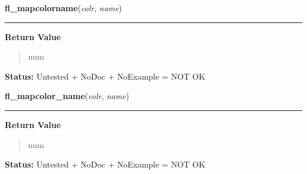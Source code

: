 \hspace{.8\funcindent}\begin{boxedminipage}{\funcwidth}

    \raggedright \textbf{fl\_mapcolorname}(\textit{colr}, \textit{name})

    \vspace{-1.5ex}

    \rule{\textwidth}{0.5\fboxrule}
\setlength{\parskip}{2ex}
\setlength{\parskip}{1ex}
      \textbf{Return Value}
    \vspace{-1ex}

      \begin{quote}
      num

      \end{quote}

\textbf{Status:} Untested + NoDoc + NoExample = NOT OK



    \end{boxedminipage}

    \label{xformslib:library:fl_mapcolorname}

    \vspace{0.5ex}

\hspace{.8\funcindent}\begin{boxedminipage}{\funcwidth}

    \raggedright \textbf{fl\_mapcolor\_name}(\textit{colr}, \textit{name})

    \vspace{-1.5ex}

    \rule{\textwidth}{0.5\fboxrule}
\setlength{\parskip}{2ex}
\setlength{\parskip}{1ex}
      \textbf{Return Value}
    \vspace{-1ex}

      \begin{quote}
      num

      \end{quote}

\textbf{Status:} Untested + NoDoc + NoExample = NOT OK



    \end{boxedminipage}

    \label{xformslib:library:fl_free_colors}

